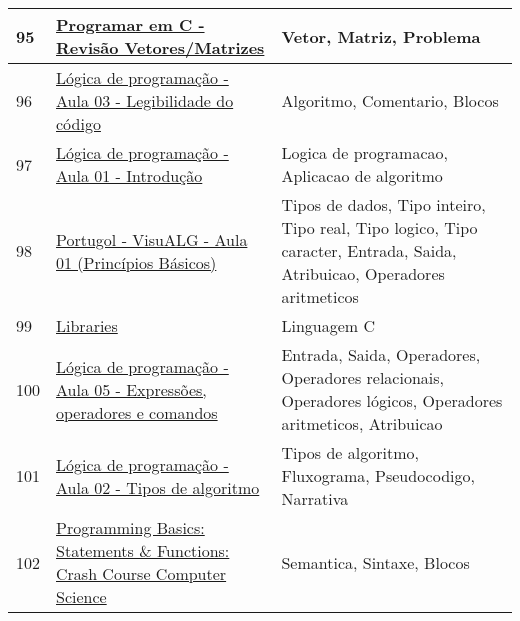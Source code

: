 \begin{longtable}{| p{} | p{} | p{} |}
95  & \href{https://www.youtube.com/watch?v=7oA8SBAOOAo}{\color{blue} Programar em C - Revisão Vetores/Matrizes                                           } & Vetor, Matriz, Problema                                                                                                                           \\ \hline
96  & \href{https://www.youtube.com/watch?v=7ph98Ih\_ckc}{\color{blue} Lógica de programação - Aula 03 - Legibilidade do código                            } & Algoritmo, Comentario, Blocos                                                                                                                     \\ \hline
97  & \href{https://www.youtube.com/watch?v=Ds1n6aHchRU}{\color{blue} Lógica de programação - Aula 01 - Introdução                                        } & Logica de programacao, Aplicacao de algoritmo                                                                                                     \\ \hline
98  & \href{https://www.youtube.com/watch?v=dZq7l9Oj-\_c}{\color{blue} Portugol - VisuALG - Aula 01 (Princípios Básicos)                                   } & Tipos de dados, Tipo inteiro, Tipo real, Tipo logico, Tipo caracter, Entrada, Saida, Atribuicao, Operadores aritmeticos                           \\ \hline
99  & \href{https://www.youtube.com/watch?v=ED7QtgXDShY}{\color{blue} Libraries                                                                           } & Linguagem C                                                                                                                                       \\ \hline
100 & \href{https://www.youtube.com/watch?v=g0iIVeeQo1M}{\color{blue} Lógica de programação - Aula 05 - Expressões, operadores e comandos                 } & Entrada, Saida, Operadores, Operadores relacionais, Operadores lógicos, Operadores aritmeticos, Atribuicao                                        \\ \hline
101 & \href{https://www.youtube.com/watch?v=JLlTo3SwxJE}{\color{blue} Lógica de programação - Aula 02 - Tipos de algoritmo                                } & Tipos de algoritmo, Fluxograma, Pseudocodigo, Narrativa                                                                                           \\ \hline
102 & \href{https://www.youtube.com/watch?v=l26oaHV7D40}{\color{blue} Programming Basics: Statements \& Functions: Crash Course Computer Science          } & Semantica, Sintaxe, Blocos                                                                                                                        \\ \hline

\end{longtable}
